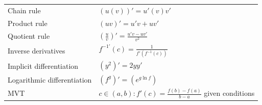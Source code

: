 \begin{landscape}
\begin{multicols*}{2}
\begin{tabularx}{\columnwidth}{@{}lX@{}}
            Chain rule                          & $(u(v))' = u'(v)v'$                                                                                                                                                                                                                                                                                                    \\
            Product rule                        & $(uv)' = u'v+uv'$                                                                                                                                                                                                                                                                                                      \\
            Quotient rule                       & $\left(\frac{u}{v}\right)' = \frac{u'v-uv'}{v^2}$                                                                                                                                                                                                                                                                      \\
            Inverse derivatives                 & $f^{-1'}(c) = \frac{1}{f'(f^{-1}(c))}$                                                                                                                                                                                                                                                                                 \\
            Implicit differentiation            & $(y^2)' = 2yy'$                                                                                                                                                                                                                                                                                                        \\
            Logarithmic differentiation         & $(f^g)'                                                                                                                                                                                                                                                                                               =(e^{g\ln f})$ \\
            MVT                                 & $ c\in(a,b):f'(c)=\frac{f(b)-f(a)}{b-a}$ given conditions                                                                                                                                                                                                                                                              \\

\end{tabularx}
\end{multicols*}
\end{landscape}
